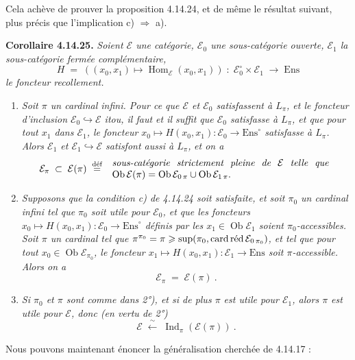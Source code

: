 \documentclass[11pt]{article}
\newcommand{\printedpage}[1]{\marginpar{\footnotesize p.~#1}}
\newcommand{\msp}[1]{\marginpar{\footnotesize [#1]}}
\newcommand{\Ob}{\operatorname{Ob}}
\DeclareMathOperator{\Ind}{Ind}
\newcommand{\cardred}{\mathop{\textup{card\,réd}}\nolimits}
\newcommand{\Hom}{\operatorname{Hom}}
\newcommand{\defeq}{\overset{\text{déf}}{=}}
\newcommand{\Ens}{\mathrm{Ens}}
\newcommand{\cE}{\mathcal{E}}
\begin{document}
Cela achève de prouver la proposition 4.14.24, et de même le résultat suivant, plus précis que l'implication c) $\Longrightarrow$ a).

\textbf{Corollaire 4.14.25.} \textit{Soient $\cE$ une catégorie, $\cE_0$ une sous-catégorie ouverte, $\cE_1$ la sous-catégorie fermée complémentaire,}
\[
H \;=\; ((x_0,x_1) \longmapsto \Hom_{\cE}(x_0,x_1)) \;:\; \cE_0^\circ \times \cE_1 \;\longrightarrow\; \Ens
\]
\textit{le foncteur recollement.}
\begin{enumerate}
\item[\textit{1°)}] \textit{Soit $\pi$ un cardinal infini. Pour ce que $\cE$ et $\cE_0$ satisfassent à $L_\pi$, et le foncteur d'inclusion $\cE_0 \hookrightarrow \cE$ itou, il faut et il suffit que $\cE_0$ satisfasse à $L_\pi$, et que pour tout $x_1$ dans $\cE_1$, le foncteur $x_0 \longmapsto H(x_0,x_1) : \cE_0 \longrightarrow \Ens^\circ$ satisfasse à $L_\pi$. Alors $\cE_1$ et $\cE_1 \hookrightarrow \cE$ satisfont aussi à $L_\pi$,}
\msp{page 421}
\textit{et on a}
\[
\cE_\pi \;\subset\; \cE(\pi) \;\defeq\;
\begin{array}{l}
\text{\itshape sous-catégorie\ \ strictement\ \ pleine\ \ de\ \ $\cE$\ \ telle\ \ que}\\
\Ob\cE(\pi) = \Ob\cE_{0\,\pi} \cup \Ob\cE_{1\,\pi}.
\end{array}
\]
\item[\textit{2°)}] \textit{Supposons que la condition c) de 4.14.24 soit satisfaite, et soit $\pi_0$ un cardinal infini tel que $\pi_0$ soit utile pour $\cE_0$, et que les foncteurs $x_0 \longmapsto H(x_0,x_1) : \cE_0 \longrightarrow \Ens^\circ$ définis par les $x_1 \in \Ob\cE_1$ soient $\pi_0$-accessibles. Soit $\pi$ un cardinal tel que $\pi^{\pi_0} = \pi \geqslant \sup(\pi_0, \cardred\cE_{0\,\pi_0})$, et tel que pour tout $x_0 \in \Ob\cE_{\pi_0}$, le foncteur $x_1 \longmapsto H(x_0,x_1) : \cE_1 \longrightarrow \Ens$ soit $\pi$-accessible. Alors on a}
\[
\cE_\pi \;=\; \cE(\pi)\ .
\]

\printedpage{160}

\item[\textit{3°)}] \textit{Si $\pi_0$ et $\pi$ sont comme dans 2°), et si de plus $\pi$ est utile pour $\cE_1$, alors $\pi$ est utile pour $\cE$, donc (en vertu de 2°)}
\[
\cE \;\xleftarrow{\ \sim\ }\; \Ind_\pi(\cE(\pi))\ .
\]
\end{enumerate}
Nous pouvons maintenant énoncer la généralisation cherchée de 4.14.17 :
\end{document}
